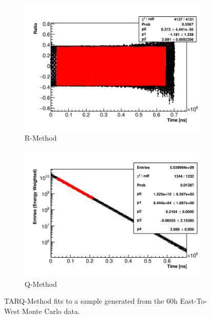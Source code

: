 \begin{figure}
    \begin{subfigure}[t]{0.45\textwidth}
        \centering
        \includegraphics[width=\textwidth]{Example_RMethod_Fit}
        \caption{R-Method}
    \end{subfigure}
    \hspace{1mm}
    \begin{subfigure}[t]{0.45\textwidth}
        \centering
        \includegraphics[width=\textwidth]{Example_QMethod_Fit}
        \caption{Q-Method}
    \end{subfigure}
\caption[]{TARQ-Method fits to a sample generated from the 60h East-To-West Monte Carlo data.}
\label{fig:sampleFits}
\end{figure}


